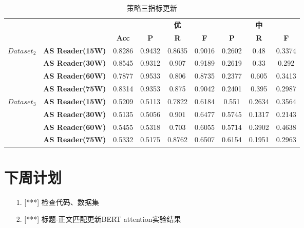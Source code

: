 \documentclass[11pt]{article}
\begin{document}
\begin{CJK}{UTF8}{gkai}
\begin{table}[htbp]\small
  \centering
  \begin{tabular}{cc|ccccccc}
    \hline
    \multicolumn{3}{c}{}  & \multicolumn{3}{p{7.5em}}{\textbf{优}} & \multicolumn{3}{p{7.5em}}{\textbf{中}} \\
    \multicolumn{2}{c}{} & \multicolumn{1}{p{2.5em}}{\textbf{Acc}} & \multicolumn{1}{p{2.5em}}{\textbf{P}} & \multicolumn{1}{p{2.5em}}{\textbf{R}} & \multicolumn{1}{p{2.5em}}{\textbf{F}} & \multicolumn{1}{p{2.5em}}{\textbf{P}} & \multicolumn{1}{p{2.5em}}{\textbf{R}} & \multicolumn{1}{p{2.5em}}{\textbf{F}} \\
    \hline
    \multirow{4}[0]{*}{$Dataset_2$} & \textbf{AS Reader(15W)} & 0.8286 & 0.9432 & 0.8635 & 0.9016 & 0.2602 & 0.48  & 0.3374 \\
    & \textbf{AS Reader(30W)} & 0.8545 & 0.9312 & 0.907 & 0.9189 & 0.2619 & 0.33  & 0.292 \\
    & \textbf{AS Reader(60W)} & 0.7877 & 0.9533 & 0.806 & 0.8735 & 0.2377 & 0.605 & 0.3413 \\
    & \textbf{AS Reader(75W)} & 0.8314 & 0.9353 & 0.875 & 0.9042 & 0.2401 & 0.395 & 0.2987 \\
    \hline
    \multirow{4}[0]{*}{$Dataset_3$} & \textbf{AS Reader(15W)} & 0.5209 & 0.5113 & 0.7822 & 0.6184 & 0.551 & 0.2634 & 0.3564 \\
    & \textbf{AS Reader(30W)} & 0.5135 & 0.5056 & 0.901 & 0.6477 & 0.5745 & 0.1317 & 0.2143 \\
    & \textbf{AS Reader(60W)} & 0.5455 & 0.5318 & 0.703 & 0.6055 & 0.5714 & 0.3902 & 0.4638 \\
    & \textbf{AS Reader(75W)} & 0.5332 & 0.5175 & 0.8762 & 0.6507 & 0.6154 & 0.1951 & 0.2963 \\
    \hline
  \end{tabular}%
  \caption{策略三指标更新}
  \label{tab:addlabel}%
\end{table}%


\section{下周计划}
\begin{itemize}
\item [1.] [***] 检查代码、数据集
\item [2.] [***] 标题-正文匹配更新BERT attention实验结果
\end{itemize}
%
%
%

\end{CJK}
\end{document}
